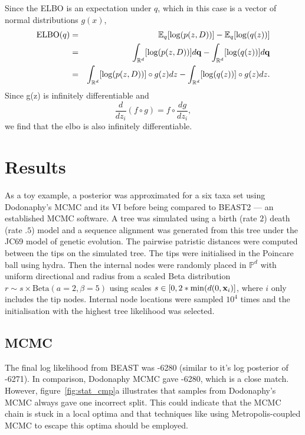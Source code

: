 \documentclass[11pt]{article}
\newcommand{\be}{\begin{equation*}}
\newcommand{\ee}{\end{equation*}}
\newcommand{\bee}{\begin{eqnarray*}}
\newcommand{\eee}{\end{eqnarray*}}
\begin{document}
Since the ELBO is an expectation under $q$, which in this case is a vector of normal distributions $g(x)$,
\bee
\text{ELBO}(q) &=& \mathbb{E}_{q}[\log(p(z,D))] - \mathbb{E}_{q}[\log(q(z))]\\
&=& \int_{\mathbb{R}^{d}}[\log(p(z,D))] d\bold{q} - \int_{\mathbb{R}^{d}}[\log(q(z))] d\bold{q}\\
&=& \int_{\mathbb{R}^{d}}[\log(p(z,D))] \circ g(z) dz - \int_{\mathbb{R}^{d}}[\log(q(z))] \circ g(z) dz.
\eee
Since g(z) is infinitely differentiable and
\be
\dfrac{d}{dz_{i}} (f \circ g) = f \circ \dfrac{dg}{dz_{i}},
\ee
we find that the elbo is also infinitely differentiable.



\section{Results}
As a toy example, a posterior was approximated for a six taxa set using Dodonaphy's MCMC and its VI before being compared to BEAST2 --- an established MCMC software.
A tree was simulated using a birth (rate $2$) death (rate $.5$) model and a sequence alignment was generated from this tree under the JC69 model of genetic evolution.
The pairwise patristic distances were computed between the tips on the simulated tree.
The tips were initialised in the Poincare ball using hydra.
Then the internal nodes were randomly placed in $\mathbb{P}^{d}$ with uniform directional and radius from a scaled Beta distribution $ r \sim s \times \text{Beta}(a=2, \beta=5)$ using scales $s \in [0, 2*\min(d(0, \bold{x}_{i})]$, where $i$ only includes the tip nodes.
Internal node locations were sampled $10^{4}$ times and the initialisation with the highest tree likelihood was selected.

\subsection{MCMC}
The final log likelihood from BEAST was -6280 (similar to it's log posterior of -6271). In comparison, Dodonaphy MCMC gave -6280, which is a close match.
However, figure~\ref{fig:stat_cmp}a illustrates that samples from Dodonaphy's MCMC always gave one incorrect split.
This could indicate that the MCMC chain is stuck in a local optima and that techniques like using Metropolis-coupled MCMC to escape this optima should be employed.
\end{document}
